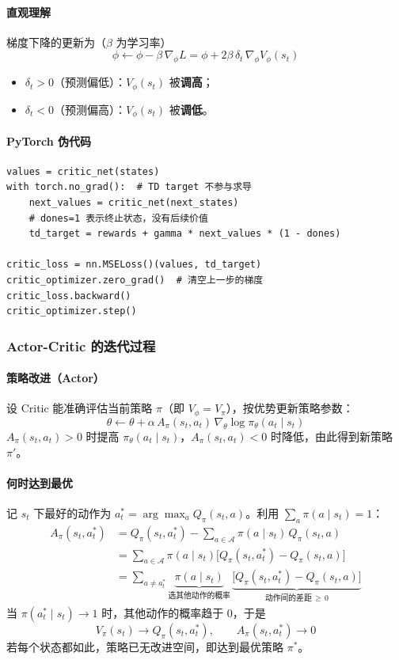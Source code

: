 \documentclass[UTF8,fontset=fandol]{ctexart}
\begin{document}
\paragraph{直观理解}
梯度下降的更新为（$\beta$ 为学习率）
\[
\phi\leftarrow\phi-\beta\,\nabla_\phi L=\phi+2\beta\,\delta_t\,\nabla_\phi V_\phi(s_t)
\]
\begin{itemize}
  \item $\delta_t>0$（预测偏低）：$V_\phi(s_t)$ 被\textbf{调高}；
  \item $\delta_t<0$（预测偏高）：$V_\phi(s_t)$ 被\textbf{调低}。
\end{itemize}

\paragraph{PyTorch 伪代码}\mbox{}
\begin{verbatim}
values = critic_net(states)
with torch.no_grad():  # TD target 不参与求导
    next_values = critic_net(next_states)
    # dones=1 表示终止状态，没有后续价值
    td_target = rewards + gamma * next_values * (1 - dones)

critic_loss = nn.MSELoss()(values, td_target)
critic_optimizer.zero_grad()  # 清空上一步的梯度
critic_loss.backward()
critic_optimizer.step()
\end{verbatim}

\subsubsection{Actor-Critic 的迭代过程}

\paragraph{策略改进（Actor）}
设 Critic 能准确评估当前策略 $\pi$（即 $V_\phi=V_\pi$），按优势更新策略参数：
\[
\theta\leftarrow\theta+\alpha\,A_\pi(s_t,a_t)\,\nabla_\theta\log\pi_\theta(a_t\mid s_t)
\]
$A_\pi(s_t,a_t)>0$ 时提高 $\pi_\theta(a_t\mid s_t)$，$A_\pi(s_t,a_t)<0$ 时降低，由此得到新策略 $\pi'$。

\paragraph{何时达到最优}
记 $s_t$ 下最好的动作为 $a_t^*=\arg\max_a Q_\pi(s_t,a)$。利用 $\sum_a\pi(a\mid s_t)=1$：
\begin{align*}
A_\pi(s_t,a_t^*)
&=Q_\pi(s_t,a_t^*)-\sum_{a\in\mathcal{A}}\pi(a\mid s_t)\,Q_\pi(s_t,a)\\
&=\sum_{a\in\mathcal{A}}\pi(a\mid s_t)\big[Q_\pi(s_t,a_t^*)-Q_\pi(s_t,a)\big]\\
&=\sum_{a\neq a_t^*}\underbrace{\pi(a\mid s_t)}_{\text{选其他动作的概率}}\,
\underbrace{\big[Q_\pi(s_t,a_t^*)-Q_\pi(s_t,a)\big]}_{\text{动作间的差距}\,\geq\,0}
\end{align*}
当 $\pi(a_t^*\mid s_t)\to 1$ 时，其他动作的概率趋于 $0$，于是
\[
V_\pi(s_t)\to Q_\pi(s_t,a_t^*),\qquad A_\pi(s_t,a_t^*)\to 0
\]
若每个状态都如此，策略已无改进空间，即达到最优策略 $\pi^*$。
\end{document}
